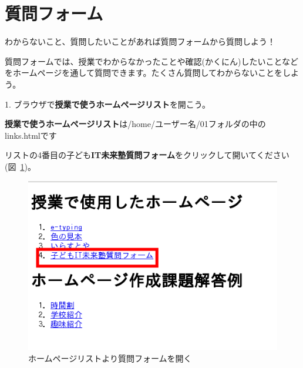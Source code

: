 \newpage
\section{質問フォーム}

わからないこと、質問したいことがあれば質問フォームから質問しよう！

質問フォームでは、授業でわからなかったことや確認(かくにん)したいことなどをホームページを通して質問できます。たくさん質問してわからないことをしよう。

1.
ブラウザで\textbf{授業で使うホームページリスト}を開こう。

\textbf{授業で使うホームページリスト}は/home/ユーザー名/01フォルダの中のlinks.htmlです

リストの4番目の子ども\textbf{IT未来塾質問フォーム}をクリックして開いてください(図~\ref{fig:open_question_form})。


\begin{description}
    \item {}
\end{description}



\begin{figure}[H]
  
    \begin{center}
      
      \includegraphics[width=11.231cm,height=7.613cm]{text04-img/textbook-img245.png}
      \caption{\label{fig:open_question_form}ホームページリストより質問フォームを開く}
    \end{center}
    
\end{figure}

